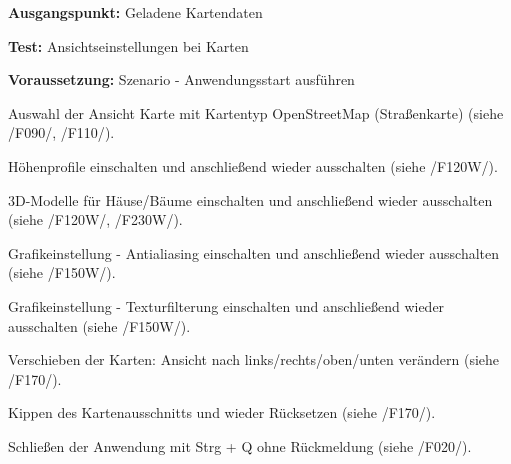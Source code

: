 \documentclass[10pt]{scrreprt}
\newcommand{\sfbf}[1]{\textbf{\sffamily #1}}
\newcommand{\ziel}[1]{{\fontsize{9.5}{11}\textsf{/#1/}}}
\newcommand{\ziellabel}{Z}
\newcommand{\muss}{\renewcommand{\labelenumi}{\textbf{\ziel{\ziellabel\numprint{\theenumi}0}}}}
\newcommand{\wunsch}{\renewcommand{\labelenumi}{\textbf{\ziel{\ziellabel\numprint{\theenumi}0W}}}}
\newenvironment{details}[1][6pt]{%
  \parskip#1 \parindent6mm \raggedright%
  \def\item{\par\ignorespaces\hangindent=5mm \hangafter1}}{%
  \par\ignorespaces}
\begin{document}
\vspace{1.0cm}
\begin{details}[2pt]
\item \sfbf{Ausgangspunkt:} Geladene Kartendaten 
\item \sfbf{Test:} Ansichtseinstellungen bei Karten 
\item \sfbf{Voraussetzung:} Szenario - Anwendungsstart ausführen
\end{details}
\begin{enumerate}[leftmargin = 2.2cm, resume]
\item Auswahl der Ansicht Karte mit Kartentyp OpenStreetMap (Straßenkarte) (siehe \ziel{F090}, \ziel{F110}).
\wunsch
\item Höhenprofile einschalten und anschließend wieder ausschalten (siehe \ziel{F120W}).
\item 3D-Modelle für Häuse/Bäume einschalten und anschließend wieder ausschalten (siehe \ziel{F120W}, \ziel{F230W}).
\item Grafikeinstellung - Antialiasing einschalten und anschließend wieder ausschalten (siehe \ziel{F150W}).
\item Grafikeinstellung - Texturfilterung einschalten und anschließend wieder ausschalten (siehe \ziel{F150W}).
\muss
\item Verschieben der Karten: Ansicht nach links/rechts/oben/unten verändern (siehe \ziel{F170}).
\item Kippen des Kartenausschnitts und wieder Rücksetzen (siehe \ziel{F170}).
\item Schließen der Anwendung mit Strg + Q ohne Rückmeldung (siehe \ziel{F020}).
\end{enumerate}
\end{document}
